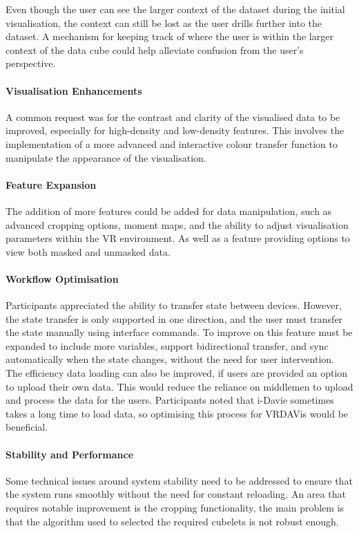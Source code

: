 Even though the user can see the larger context of the dataset during the initial visualisation, the context can still be lost as the user drills further into the dataset.
A mechanism for keeping track of where the user is within the larger context of the data cube could help alleviate confusion from the user's perspective.

\paragraph{Visualisation Enhancements}
A common request was for the contrast and clarity of the visualised data to be improved, especially for high-density and low-density features. 
This involves the implementation of a more advanced and interactive colour transfer function to manipulate the appearance of the visualisation.

\paragraph{Feature Expansion}
The addition of more features could be added for data manipulation, such as advanced cropping options, moment maps, and the ability to adjust visualisation parameters within the VR environment.
As well as a feature providing options to view both masked and unmasked data.

\paragraph{Workflow Optimisation}
Participants appreciated the ability to transfer state between devices.
However, the state transfer is only supported in one direction, and the user must transfer the state manually using interface commands.
To improve on this feature must be expanded to include more variables, support bidirectional transfer, and sync automatically when the state changes, without the need for user intervention.
The efficiency data loading can also be improved, if users are provided an option to upload their own data.
This would reduce the reliance on middlemen to upload and process the data for the users.
Participants noted that i-Davie sometimes takes a long time to load data, so optimising this process for VRDAVis would be beneficial.

\paragraph{Stability and Performance}
Some technical issues around system stability need to be addressed to ensure that the system runs smoothly without the need for constant reloading.
An area that requires notable improvement is the cropping functionality, the main problem is that the algorithm used to selected the required cubelets is not robust enough.

